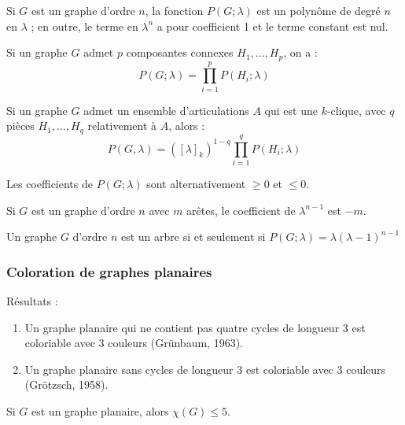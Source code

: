 \begin{corollaire}
Si $G$ est un graphe d'ordre $n$, la fonction $P(G;\lambda)$ est un polynôme de degré $n$
en $\lambda$ ; en outre, le terme en $\lambda^n$ a pour coefficient 1 et le terme
constant est nul.
\end{corollaire}
\setcounter{corollaire}{0}


\begin{prop}
Si un graphe $G$ admet $p$ composantes connexes $H_1,\dots,H_p$, on a :
$$P(G;\lambda)=\prod_{i=1}^p P(H_i;\lambda)$$
\end{prop}

\begin{prop}
Si un graphe $G$ admet un ensemble d'articulations $A$ qui est une $k$-clique,
avec $q$ pièces $H_1,\dots,H_q$ relativement à $A$, alors :
$$P(G,\lambda)=([\lambda]_k)^{1-q}\prod_{i=1}^q P(H_i;\lambda)$$
\end{prop}

\begin{theorem}
Les coefficients de $P(G;\lambda)$ sont alternativement $\geq 0$ et $\leq 0$.
\end{theorem}

\begin{corollaire}
Si $G$ est un graphe d'ordre $n$ avec $m$ arêtes, le coefficient de
$\lambda^{n-1}$ est $-m$.
\end{corollaire}

\begin{theorem}
Un graphe $G$ d'ordre $n$ est un arbre si et seulement si $P(G;\lambda)=\lambda(\lambda-1)^{n-1}$
\end{theorem}

\subsubsection{Coloration de graphes planaires}
Résultats :
\begin{enumerate}
 \item Un graphe planaire qui ne contient pas quatre cycles de longueur 3 est coloriable avec 3 couleurs (Grünbaum, 1963).
 \item Un graphe planaire sans cycles de longueur 3 est coloriable avec 3 couleurs (Grötzsch, 1958).
\end{enumerate}

\begin{theorem}
Si $G$ est un graphe planaire, alors $\chi(G)\leq 5$.
\end{theorem}

